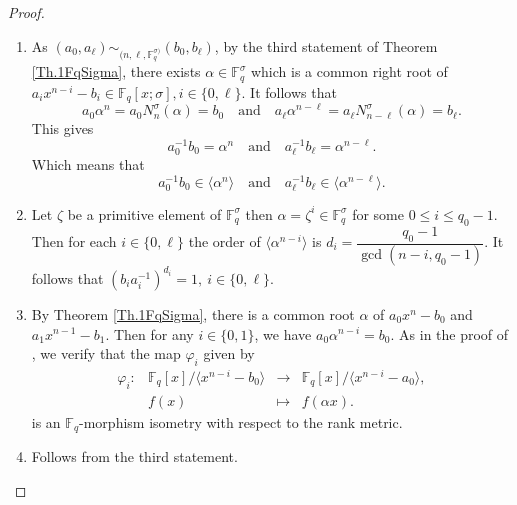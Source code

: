 \documentclass[12pt,paper]{article}
\theoremstyle{plain}
\newcommand{\Fq}{\mathbb{F}_{q}}
\begin{document}
\begin{proof}
\begin{enumerate}
\item  As $ (a_0, a_{\ell}) \sim_{(n, \ell,\Fq^{\sigma)}} (b_0, b_{\ell})$, by the third statement of Theorem \ref{Th.1FqSigma}, there
exists  $\alpha\in \Fq^{\sigma}$ which is a common right root of $\displaystyle a_i x^{n-i } - b_i \in \Fq[x;\sigma], i \in \{0,\ell\}. $ It follows that $$ a_0 \alpha^n= a_0 N_n^{\sigma}(\alpha)   = b_0   \quad  \text{and} \quad   a_{\ell} \alpha^{n-\ell} = a_{\ell}N_{n-\ell}^{\sigma}(\alpha) =  b_{\ell}. $$ 
This gives
$$ a_0^{-1}  b_0 = \alpha^n  \quad  \text{and} \quad   a_{\ell}^{-1}   b_{\ell}=  \alpha^{n-\ell} . $$
Which means that  
$$ a_0^{-1}  b_0 \in   \langle \alpha^{n} \rangle  \quad  \text{and} \quad   a_{\ell}^{-1}   b_{\ell} \in   \langle \alpha^{n-\ell} \rangle. $$

\item  Let $\zeta $ be a primitive element of $ \Fq^{\sigma}$ then $\alpha= \zeta^i\in \Fq^{\sigma}$ for some $ 0\leq i\leq q_0-1.$  
Then for each  $i\in \{0,\ell\}$ the order of $ \langle \alpha^{n-i} \rangle $ is  $d_i=\dfrac{q_0-1}{\gcd(n-i, q_0-1)}.$ It follows that  $(b_i a_i^{-1})^{d_i} =1 ,\ i\in \{0,\ell\}.$
\item By Theorem \ref{Th.1FqSigma}, there is  a common root $\alpha$  of $a_0  x^n-b_0$ and $a_1 x^{n-1}-b_1$. Then for 
 any  $i\in \{0,1\}$,  we have $ a_0  \alpha^{n-i}=b_0.$ As in the proof of \cite[Theorem 6]{Ouazzou2025}, we verify
 that the  map  $\varphi_i$ given by 
\begin{equation}
  	\begin{array}{cccc}
  	\varphi_{i}:& \mathbb{F}_q[x] /\langle x^{n-i}-b_0 \rangle  &\longrightarrow & \mathbb{F}_q[x] /\langle x^{n-i}-a_0 \rangle, \\
  	& f(x) & \longmapsto &  f(\alpha x).
  	\end{array}
  	\end{equation} 
    is an $\Fq$-morphism isometry with respect to the rank metric.
    \item Follows from the third statement.
\end{enumerate}
\end{proof}
\end{document}
